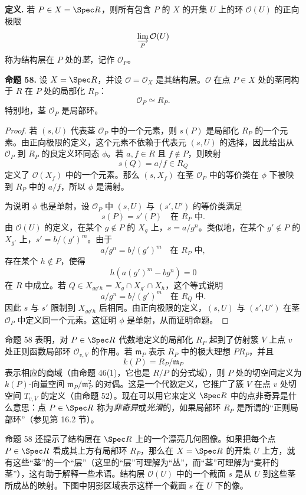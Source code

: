 \noindent\textbf{定义.} 若 $P\in X=\Spec R$，则所有包含 $P$ 的 $X$ 的开集 $U$ 上的环 $\mathcal O(U)$ 的正向极限
\[
\varinjlim_P\mathcal O(U)
\]
称为结构层在 $P$ 处的\emph{茎}，记作 $\mathcal O_P$。

\noindent\textbf{命题 58.} 设 $X=\Spec R$，并设 $\mathcal O=\mathcal O_X$ 是其结构层。$\mathcal O$ 在点 $P\in X$ 处的茎同构于 $R$ 在 $P$ 处的局部化 $R_P$：
\[
\mathcal O_P\simeq R_P.
\]
特别地，茎 $\mathcal O_P$ 是局部环。

\begin{proof}
	若 $(s,U)$ 代表茎 $\mathcal O_P$ 中的一个元素，则 $s(P)$ 是局部化 $R_P$ 的一个元素。由正向极限的定义，这个元素不依赖于代表元 $(s,U)$ 的选择，因此给出从 $\mathcal O_P$ 到 $R_P$ 的良定义环同态 $\phi$。若 $a,f\in R$ 且 $f\notin P$，则映射
	\[
	s(Q)=a/f\in R_Q
	\]
	定义了 $\mathcal O(X_f)$ 中的一个元素。那么 $(s,X_f)$ 在茎 $\mathcal O_P$ 中的等价类在 $\phi$ 下被映到 $R_P$ 中的 $a/f$，所以 $\phi$ 是满射。
	
	为说明 $\phi$ 也是单射，设 $\mathcal O_P$ 中 $(s,U)$ 与 $(s',U')$ 的等价类满足
	\[
	s(P)=s'(P)\quad\text{在 }R_P\text{ 中}.
	\]
	由 $\mathcal O(U)$ 的定义，在某个 $g\notin P$ 的 $X_g$ 上，$s=a/g^n$。类似地，在某个 $g'\notin P$ 的 $X_{g'}$ 上，$s'=b/(g')^m$。由于
	\[
	a/g^n=b/(g')^m\quad\text{在 }R_P\text{ 中},
	\]
	存在某个 $h\notin P$，使得
	\[
	h(a(g')^m-bg^n)=0
	\]
	在 $R$ 中成立。若 $Q\in X_{gg'h}=X_g\cap X_{g'}\cap X_h$，这个等式说明
	\[
	a/g^n=b/(g')^m\quad\text{在 }R_Q\text{ 中}.
	\]
	因此 $s$ 与 $s'$ 限制到 $X_{gg'h}$ 后相同。由正向极限的定义，$(s,U)$ 与 $(s',U')$ 在茎 $\mathcal O_P$ 中定义同一个元素。这证明 $\phi$ 是单射，从而证明命题。
\end{proof}

命题 58 表明，对 $P\in\Spec R$ 代数地定义的局部化 $R_P$ 起到了仿射簇 $V$ 上点 $v$ 处正则函数局部环 $\mathcal O_{v,V}$ 的作用。若 $\mathfrak m_P$ 表示 $R_P$ 中的极大理想 $PR_P$，并且
\[
k(P)=R_P/\mathfrak m_P
\]
表示相应的商域（由命题 46(1)，它也是 $R/P$ 的分式域），则 $P$ 处的切空间定义为 $k(P)$-向量空间 $\mathfrak m_P/\mathfrak m_P^2$ 的对偶。这是一个代数定义，它推广了簇 $V$ 在点 $v$ 处切空间 $T_{v,V}$ 的定义（由命题 52）。现在可以用它来定义 $\Spec R$ 中的点非奇异是什么意思：点 $P\in\Spec R$ 称为\emph{非奇异}或\emph{光滑}的，如果局部环 $R_P$ 是所谓的“正则局部环”（参见第 16.2 节）。

命题 58 还提示了结构层在 $\Spec R$ 上的一个漂亮几何图像。如果把每个点 $P\in\Spec R$ 看成其上方有局部环 $R_P$，那么在 $X=\Spec R$ 的开集 $U$ 上方，就有这些“茎”的一个“层”（这里的“层”可理解为“丛”，而“茎”可理解为“麦秆的茎”），这有助于解释一些术语。结构层 $\mathcal O(U)$ 中的一个截面 $s$ 是从 $U$ 到这些茎所成丛的映射。下图中阴影区域表示这样一个截面 $s$ 在 $U$ 下的像。

